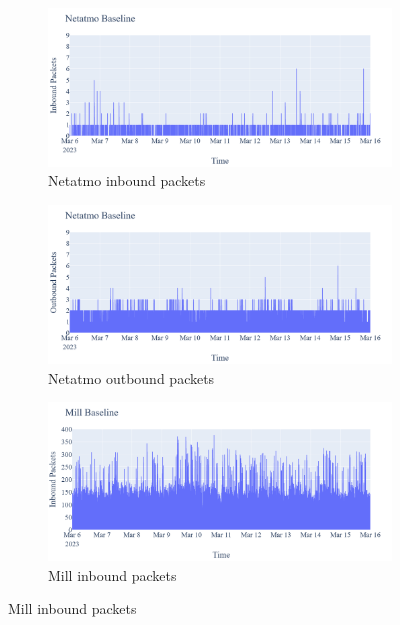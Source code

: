 \begin{figure}[H]
    \centering
    \begin{subfigure}[b]{0.4\textwidth}
        \includegraphics[width=\textwidth]{figures/Netatmo_Baseline_InboundPackets.png}
        \caption{Netatmo inbound packets}
    \end{subfigure}
    \begin{subfigure}[b]{0.4\textwidth}
        \includegraphics[width=\textwidth]{figures/Netatmo_Baseline_OutboundPackets.png}
        \caption{Netatmo outbound packets}
    \end{subfigure}
    \begin{subfigure}[b]{0.4\textwidth}
        \includegraphics[width=\textwidth]{figures/Mill_Baseline_InboundPackets.png}
        \caption{Mill inbound packets}

\end{subfigure}
\end{figure}
